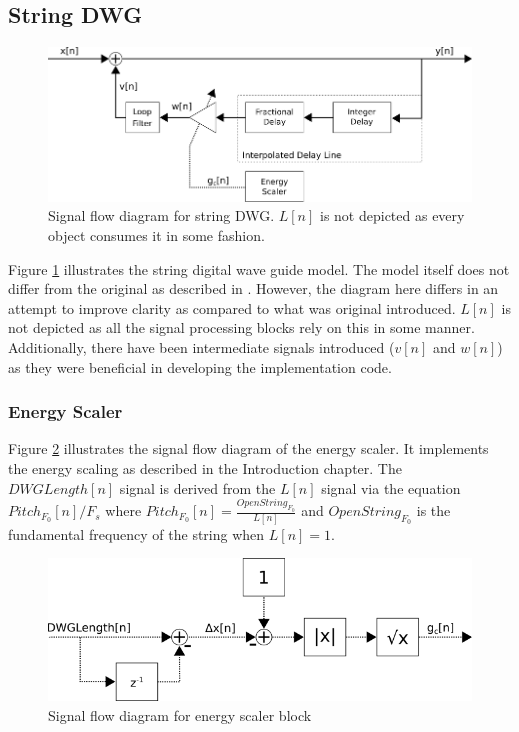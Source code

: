 \documentclass[../main.tex]{subfiles}
\begin{document}
\subsection{String DWG}

\begin{figure}[h]
    \centering
    \includegraphics[scale=.5]{./images/diagrams/stringDWG.png}
    \caption{Signal flow diagram for string DWG. $L[n]$ is not depicted as every object consumes it in some fashion.}
    \label{fig:stringDWG}
\end{figure}

Figure \ref{fig:stringDWG} illustrates the string digital wave guide model. The model itself does not differ from the original as described in . However, the diagram here differs in an attempt to improve clarity as compared to what was original introduced. $L[n]$ is not depicted as all the signal processing blocks rely on this in some manner. Additionally, there have been intermediate signals introduced ($v[n]$ and $w[n]$) as they were beneficial in developing the implementation code.

\subsubsection{Energy Scaler}
Figure \ref{fig:energyScaler} illustrates the signal flow diagram of the energy scaler. It implements the energy scaling as described in the Introduction chapter. The $DWGLength[n]$ signal is derived from the $L[n]$ signal via the equation $Pitch_{F_0}[n] / F_s$ where $ Pitch_{F_0}[n] = \frac{OpenString_{F_0}}{L[n]}$ and $OpenString_{F_0}$ is the fundamental frequency of the string when $L[n] = 1$.

\begin{figure}[h]
    \centering
    \includegraphics[scale=.5]{./images/diagrams/energyScaler.png}
    \caption{Signal flow diagram for energy scaler block}
    \label{fig:energyScaler}
\end{figure}
\end{document}
